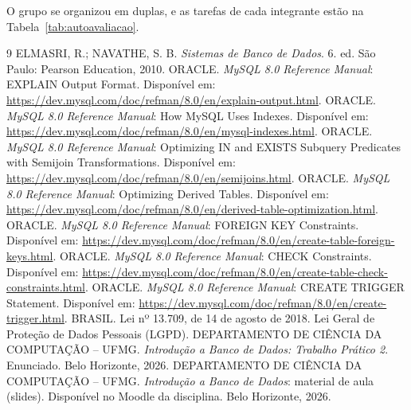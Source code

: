 \documentclass[10pt,a4paper]{article}
\begin{document}
O grupo se organizou em duplas, e as tarefas de cada integrante estão na Tabela~\ref{tab:autoavaliacao}. %

\begin{thebibliography}{9}\small
{} ELMASRI, R.; NAVATHE, S. B. \textit{Sistemas de Banco de Dados}. 6. ed. São Paulo: Pearson Education, 2010.
 ORACLE. \textit{MySQL 8.0 Reference Manual}: EXPLAIN Output Format. Disponível em: \url{https://dev.mysql.com/doc/refman/8.0/en/explain-output.html}.
 ORACLE. \textit{MySQL 8.0 Reference Manual}: How MySQL Uses Indexes. Disponível em: \url{https://dev.mysql.com/doc/refman/8.0/en/mysql-indexes.html}.
 ORACLE. \textit{MySQL 8.0 Reference Manual}: Optimizing IN and EXISTS Subquery Predicates with Semijoin Transformations. Disponível em: \url{https://dev.mysql.com/doc/refman/8.0/en/semijoins.html}.
 ORACLE. \textit{MySQL 8.0 Reference Manual}: Optimizing Derived Tables. Disponível em: \url{https://dev.mysql.com/doc/refman/8.0/en/derived-table-optimization.html}.
 ORACLE. \textit{MySQL 8.0 Reference Manual}: FOREIGN KEY Constraints. Disponível em: \url{https://dev.mysql.com/doc/refman/8.0/en/create-table-foreign-keys.html}.
 ORACLE. \textit{MySQL 8.0 Reference Manual}: CHECK Constraints. Disponível em: \url{https://dev.mysql.com/doc/refman/8.0/en/create-table-check-constraints.html}.
 ORACLE. \textit{MySQL 8.0 Reference Manual}: CREATE TRIGGER Statement. Disponível em: \url{https://dev.mysql.com/doc/refman/8.0/en/create-trigger.html}.
 BRASIL. Lei nº 13.709, de 14 de agosto de 2018. Lei Geral de Proteção de Dados Pessoais (LGPD).
 DEPARTAMENTO DE CIÊNCIA DA COMPUTAÇÃO -- UFMG. \textit{Introdução a Banco de Dados: Trabalho Prático 2}. Enunciado. Belo Horizonte, 2026.
 DEPARTAMENTO DE CIÊNCIA DA COMPUTAÇÃO -- UFMG. \textit{Introdução a Banco de Dados}: material de aula (slides). Disponível no Moodle da disciplina. Belo Horizonte, 2026.
\end{thebibliography}
\end{document}
